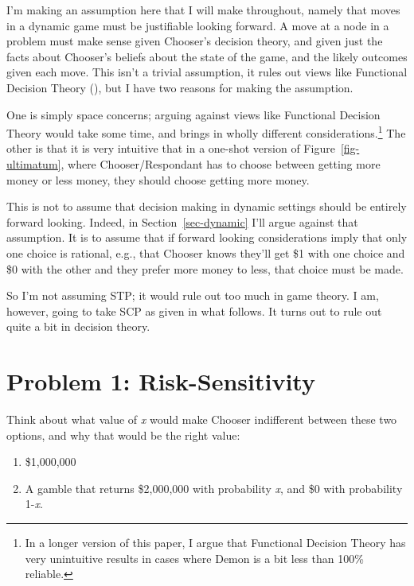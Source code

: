 \documentclass[
  10pt,
  letterpaper,
  DIV=11,
  numbers=noendperiod,
  twoside]{scrartcl}
\providecommand{\tightlist}{%
  \setlength{\itemsep}{0pt}\setlength{\parskip}{0pt}}\usepackage{longtable,booktabs,array}
\begin{document}
I'm making an assumption here that I will make throughout, namely that
moves in a dynamic game must be justifiable looking forward. A move at a
node in a problem must make sense given Chooser's decision theory, and
given just the facts about Chooser's beliefs about the state of the
game, and the likely outcomes given each move. This isn't a trivial
assumption, it rules out views like Functional Decision Theory
(), but I
have two reasons for making the assumption.

One is simply space concerns; arguing against views like Functional
Decision Theory would take some time, and brings in wholly different
considerations.\footnote{In a longer version of this paper, I argue that
  Functional Decision Theory has very unintuitive results in cases where
  Demon is a bit less than 100\% reliable.} The other is that it is very
intuitive that in a one-shot version of Figure~\ref{fig-ultimatum},
where Chooser/Respondant has to choose between getting more money or
less money, they should choose getting more money.

This is not to assume that decision making in dynamic settings should be
entirely forward looking. Indeed, in Section~\ref{sec-dynamic} I'll
argue against that assumption. It is to assume that if forward looking
considerations imply that only one choice is rational, e.g., that
Chooser knows they'll get \$1 with one choice and \$0 with the other and
they prefer more money to less, that choice must be made.

So I'm not assuming STP; it would rule out too much in game theory. I
am, however, going to take SCP as given in what follows. It turns out to
rule out quite a bit in decision theory.

\section{Problem 1: Risk-Sensitivity}\label{sec-buchak}

Think about what value of \emph{x} would make Chooser indifferent
between these two options, and why that would be the right value:

\begin{enumerate}
\def\labelenumi{\arabic{enumi}.}
\tightlist
\item
  \$1,000,000
\item
  A gamble that returns \$2,000,000 with probability \emph{x}, and \$0
  with probability 1-\emph{x}.
\end{enumerate}
\end{document}
